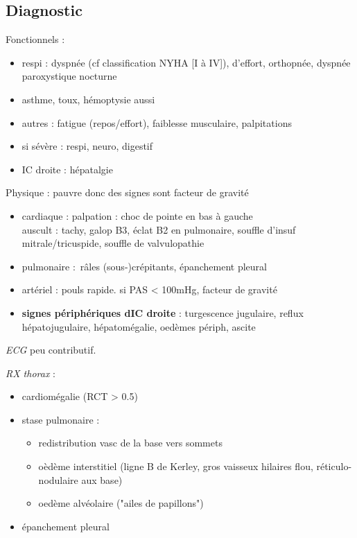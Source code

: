 \documentclass{article}
\begin{document}
\subsection{Diagnostic}
Fonctionnels :
\begin{itemize}
  \item respi : dyspnée (cf classification NYHA [I à IV]), d'effort, orthopnée, dyspnée paroxystique nocturne
  \item \danger{} asthme, toux, hémoptysie aussi 
  \item autres : fatigue (repos/effort), faiblesse musculaire, palpitations
  \item si sévère : respi, neuro, digestif
  \item IC droite : hépatalgie
\end{itemize}
Physique : pauvre donc des signes sont facteur de gravité
\begin{itemize}
  \item cardiaque : palpation : choc de pointe en bas à gauche\\
    auscult : tachy, galop B3, éclat B2 en pulmonaire, souffle d'insuf
    mitrale/tricuspide, souffle de valvulopathie
  \item pulmonaire : râles (sous-)crépitants, épanchement pleural
  \item artériel : pouls rapide. si PAS < 100mHg, facteur de gravité
  \item \textbf{signes périphériques dIC droite} : turgescence jugulaire, reflux
    hépatojugulaire, hépatomégalie, oedèmes périph, ascite
\end{itemize}

\textit{ECG}  peu contributif.

\textit{RX thorax}  :
\begin{itemize}
  \item cardiomégalie (RCT > 0.5)
  \item stase pulmonaire :
    \begin{itemize}
      \item redistribution vasc de la base vers sommets
      \item oèdème interstitiel (ligne B de Kerley, gros vaisseux hilaires flou,
        réticulo-nodulaire aux base)
      \item oedème alvéolaire ("ailes de papillons")
    \end{itemize}
  \item épanchement pleural
\end{itemize}
\end{document}
